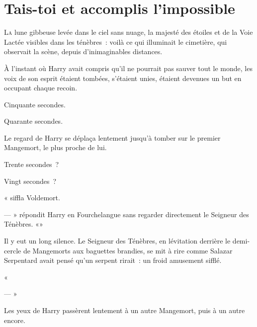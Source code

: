 \chapter{Tais-toi et accomplis l'impossible}

\lettrine{L}{a} lune gibbeuse levée dans le ciel sans nuage, la majesté des étoiles et de la Voie Lactée visibles dans les ténèbres~: voilà ce qui illuminait le cimetière, qui observait la scène, depuis d'inimaginables distances.

À l'instant où Harry avait compris qu'il ne pourrait pas sauver tout le monde, les voix de son esprit étaient tombées, s'étaient unies, étaient devenues un but en occupant chaque recoin.

Cinquante secondes.

Quarante secondes.

Le regard de Harry se déplaça lentement jusqu'à tomber sur le premier Mangemort, le plus proche de lui.

Trente secondes~?

Vingt secondes~?

« siffla Voldemort.

--- » répondit Harry en Fourchelangue sans regarder directement le Seigneur des Ténèbres. «»

Il y eut un long silence. Le Seigneur des Ténèbres, en lévitation derrière le demi-cercle de Mangemorts aux baguettes brandies, se mit à rire comme Salazar Serpentard avait pensé qu'un serpent rirait~: un froid amusement sifflé.

«

--- »

Les yeux de Harry passèrent lentement à un autre Mangemort, puis à un autre encore.

